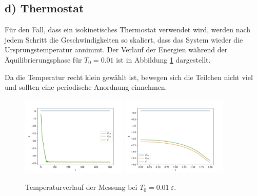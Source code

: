 \FloatBarrier
 \subsection*{d) Thermostat}

Für den Fall, dass ein isokinetisches Thermostat verwendet wird, werden nach jedem Schritt die Geschwindigkeiten so skaliert, dass das System wieder die Ursprungstemperatur annimmt.
Der Verlauf der Energien während der Äquilibrierungsphase für $T_0 = 0.01$ ist in Abbildung \ref{fig:thermostat_equi_energy}   dargestellt.

Da die Temperatur recht klein gewählt ist, bewegen sich die Teilchen nicht viel
und sollten eine periodische Anordnung einnehmen.

\begin{figure}
    \centering
    \includegraphics[width=0.45\textwidth]{A1/build/aequi_isokinetisch001_E.pdf}
    \includegraphics[width=0.45\textwidth]{A1/build/aequi_isokinetisch001_EE.pdf}
    \caption{Temperaturverlauf der Messung bei $T_0 = 0.01\:\varepsilon$.}
    \label{fig:thermostat_equi_energy}
\end{figure}
